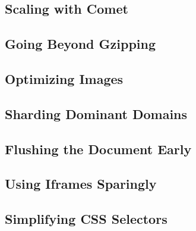 \subsection{Scaling with Comet}
\subsection{Going Beyond Gzipping}
\subsection{Optimizing Images}
\subsection{Sharding Dominant Domains}
\subsection{Flushing the Document Early}
\subsection{Using Iframes Sparingly}
\subsection{Simplifying CSS Selectors}

